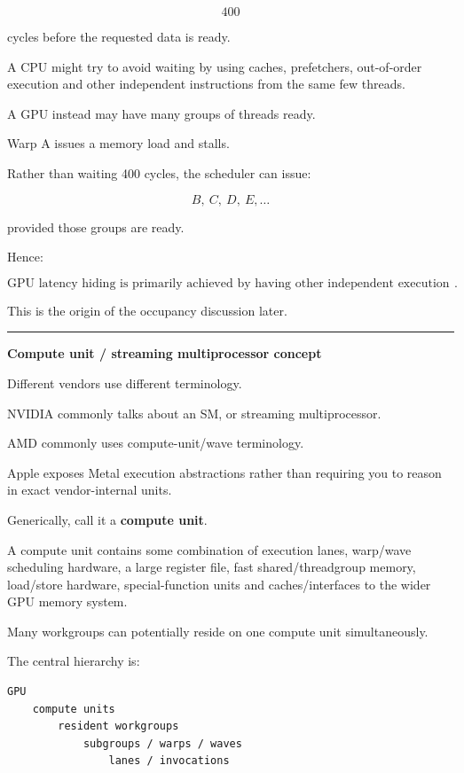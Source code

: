 \[
400
\]

cycles before the requested data is ready.

A CPU might try to avoid waiting by using caches, prefetchers, out-of-order execution and other independent instructions from the same few threads.

A GPU instead may have many groups of threads ready.

Warp A issues a memory load and stalls.

Rather than waiting 400 cycles, the scheduler can issue:

\[
B,\ C,\ D,\ E,\dots
\]

provided those groups are ready.

Hence:

\[
\boxed{
\text{GPU latency hiding is primarily achieved by having other independent execution groups resident}.
}
\]

This is the origin of the occupancy discussion later.

\begin{center}\rule{0.5\linewidth}{0.5pt}\end{center}

\textbf{Compute unit / streaming multiprocessor concept}

Different vendors use different terminology.

NVIDIA commonly talks about an SM, or streaming multiprocessor.

AMD commonly uses compute-unit/wave terminology.

Apple exposes Metal execution abstractions rather than requiring you to reason in exact vendor-internal units.

Generically, call it a \textbf{compute unit}.

A compute unit contains some combination of execution lanes, warp/wave scheduling hardware, a large register file, fast shared/threadgroup memory, load/store hardware, special-function units and caches/interfaces to the wider GPU memory system.

Many workgroups can potentially reside on one compute unit simultaneously.

The central hierarchy is:

\protect{}\label{5kw7e9}%
\begin{verbatim}
GPU
    compute units
        resident workgroups
            subgroups / warps / waves
                lanes / invocations
\end{verbatim}

